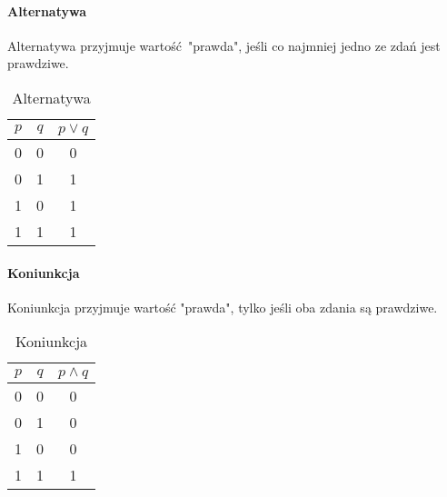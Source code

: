 \documentclass{article}
\begin{document}
    \paragraph{Alternatywa}
    Alternatywa przyjmuje wartość "prawda", jeśli co najmniej jedno ze zdań jest prawdziwe.
    \begin{table}[h!]
        \begin{center}
            \caption{Alternatywa}
            \label{tab:tabela2}
            \begin{tabular}{c|c|c}
                \textbf{$p$} & \textbf{$q$} & \textbf{$p \vee q$} \\
                \midrule
                0 & 0 & 0\\
                0 & 1 & 1\\
                1 & 0 & 1\\
                1 & 1 & 1\\
                \bottomrule
            \end{tabular}
        \end{center}
    \end{table}
    \paragraph{Koniunkcja}
    Koniunkcja przyjmuje wartość "prawda", tylko jeśli oba zdania są prawdziwe.
    \begin{table}[h!]
        \begin{center}
            \caption{Koniunkcja}
            \label{tab:tabela3}
            \begin{tabular}{c|c|c}
                \textbf{$p$} & \textbf{$q$} & \textbf{$p \wedge q$} \\
                \midrule
                0 & 0 & 0\\
                0 & 1 & 0\\
                1 & 0 & 0\\
                1 & 1 & 1\\
                \bottomrule
            \end{tabular}
        \end{center}
    \end{table}
\end{document}
